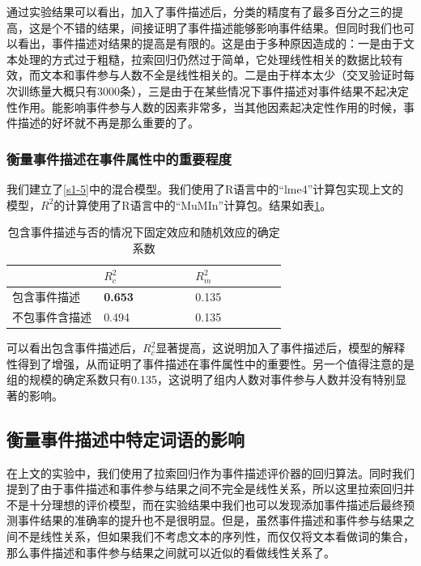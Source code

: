 通过实验结果可以看出，加入了事件描述后，分类的精度有了最多百分之三的提高，这是个不错的结果，间接证明了事件描述能够影响事件结果。但同时我们也可以看出，事件描述对结果的提高是有限的。这是由于多种原因造成的：一是由于文本处理的方式过于粗糙，拉索回归仍然过于简单，它处理线性相关的数据比较有效，而文本和事件参与人数不全是线性相关的。二是由于样本太少（交叉验证时每次训练量大概只有3000条），三是由于在某些情况下事件描述对事件结果不起决定性作用。能影响事件参与人数的因素非常多，当其他因素起决定性作用的时候，事件描述的好坏就不再是那么重要的了。

\subsubsection{衡量事件描述在事件属性中的重要程度}
我们建立了\ref{s1-5}中的混合模型。我们使用了R语言中的``lme4''计算包\citep{lme4}实现上文的模型，\(R^2\)的计算使用了R语言中的``MuMIn''计算包\citep{MuMIn}。结果如表\ref{t1-4}。

\begin{table}[htbp]
  \caption{\label{t1-4}包含事件描述与否的情况下固定效应和随机效应的确定系数}
	\centering  
    \begin{tabular*}{\linewidth}{p{0.33\linewidth}p{0.33\linewidth}p{0.33\linewidth}}
  \toprule
    &  \(R_c^2\) & \(R_m^2\) \\ 
  \midrule
		包含事件描述                       & \textbf{0.653} & 0.135 \\ 
    不包事件含描述                        & 0.494 & 0.135 \\ 
  \bottomrule
    \end{tabular*}
\end{table}

可以看出包含事件描述后，\(R_c^2\)显著提高，这说明加入了事件描述后，模型的解释性得到了增强，从而证明了事件描述在事件属性中的重要性。另一个值得注意的是组的规模的确定系数只有0.135，这说明了组内人数对事件参与人数并没有特别显著的影响。

\subsection{衡量事件描述中特定词语的影响}
在上文的实验中，我们使用了拉索回归作为事件描述评价器的回归算法。同时我们提到了由于事件描述和事件参与结果之间不完全是线性关系，所以这里拉索回归并不是十分理想的评价模型，而在实验结果中我们也可以发现添加事件描述后最终预测事件结果的准确率的提升也不是很明显。但是，虽然事件描述和事件参与结果之间不是线性关系，但如果我们不考虑文本的序列性，而仅仅将文本看做词的集合，那么事件描述和事件参与结果之间就可以近似的看做线性关系了。

